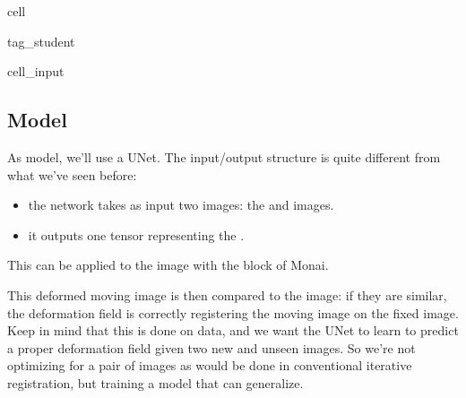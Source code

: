 \documentclass[letterpaper,10pt,english]{jupyterBook}
\begin{document}
\begin{sphinxuseclass}{cell}
\begin{sphinxuseclass}{tag_student}\begin{sphinxVerbatimInput}

\begin{sphinxuseclass}{cell_input}
\begin{sphinxVerbatim}[commandchars=\\\{\}]
\end{sphinxVerbatim}

\end{sphinxuseclass}\end{sphinxVerbatimInput}

\end{sphinxuseclass}
\end{sphinxuseclass}

\subsection{Model}
\label{\detokenize{notebooks/Tutorial6_Registration/Tutorial6_Registration_student:model}}
\sphinxAtStartPar
As model, we’ll use a U\sphinxhyphen{}Net. The input/output structure is quite different from what we’ve seen before:
\begin{itemize}
\item {} 
\sphinxAtStartPar
the network takes as input two images: the  and  images.

\item {} 
\sphinxAtStartPar
it outputs one tensor representing the .

\end{itemize}

\sphinxAtStartPar
{}

\sphinxAtStartPar
This  can be applied to the  image with the  block of Monai.

\sphinxAtStartPar
{}

\sphinxAtStartPar
This deformed moving image is then compared to the  image: if they are similar, the deformation field is correctly registering the moving image on the fixed image. Keep in mind that this is done on  data, and we want the U\sphinxhyphen{}Net to learn to predict a proper deformation field given two new and unseen images. So we’re not optimizing for a pair of images as would be done in conventional iterative registration, but training a model that can generalize.
\end{document}
